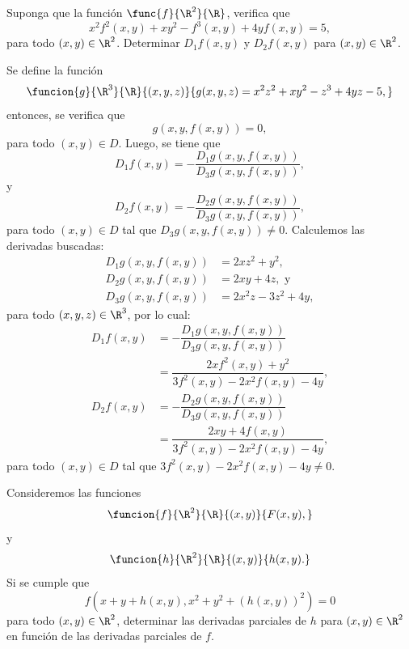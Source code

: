 \documentclass[a4,11pt]{aleph-examen}
\begin{document}
\begin{preguntas}
\begin{respuesta}
\begin{respuesta}
\item 
    Suponga que la función $\func{f}{\R^2}{\R}$, verifica que
    \[
        x^2 f^2(x, y) + x y^2 - f^3(x, y) + 4 y f(x, y) = 5,
    \]
    para todo $(x, y)\in \R^2$. Determinar $D_1 f(x, y)$ y $D_2 f(x, y)$ para $(x, y)\in \R^2$.

\begin{respuesta}
    Se define la función
    \[
    \funcion{g}{\R^3}{\R}
    {(x, y, z)}{g(x, y, z) = x^2 z^2 + x y^2 - z^3 + 4yz - 5,}
	\]
    entonces, se verifica que
    \[
    g(x, y, f(x, y)) = 0,
    \]
    para todo $(x, y)\in D$. Luego, se tiene que
    \[
    D_1 f(x, y) = -\dfrac{D_1 g(x, y, f(x, y))}{D_3 g(x, y, f(x, y))},
    \]
    y
    \[
    D_2 f(x, y) = -\dfrac{D_2 g(x, y, f(x, y))}{D_3 g(x, y, f(x, y))},
    \]
    para todo $(x, y) \in D$ tal que $D_3 g(x, y, f(x, y)) \neq 0$.
    Calculemos las derivadas buscadas:
    \begin{align*}
    D_1 g(x, y, f(x, y)) &= 2xz^2 + y^2,\\
    D_2 g(x, y, f(x, y)) &= 2xy + 4z, \mbox{ y}\\
    D_3 g(x, y, f(x, y)) &= 2x^2 z - 3z^2 + 4y,
    \end{align*}
    para todo $(x, y, z)\in\R^3$, por lo cual:
    \begin{align*}
        D_1 f(x, y) &= -\dfrac{D_1 g(x, y, f(x, y))}{D_3 g(x, y, f(x, y))}\\
        &= \dfrac{2xf^2(x, y) + y^2}{3f^2(x, y) - 2x^2 f(x, y) - 4y},
    \end{align*}
    \begin{align*}
        D_2 f(x, y) &= -\dfrac{D_2 g(x, y, f(x, y))}{D_3 g(x, y, f(x, y))}\\
        &= \dfrac{2xy + 4f(x, y)}{3f^2(x, y) - 2x^2 f(x, y) - 4y},
    \end{align*}
    para todo $(x, y)\in D$ tal que $3f^2(x, y) - 2x^2 f(x, y) - 4y \neq 0$.
\end{respuesta}

\item
    Consideremos las funciones
    \[
        \funcion{f}{\R^2}{\R}{(x,y)}{F(x,y),}
    \]
    y 
    \[
        \funcion{h}{\R^2}{\R}{(x,y)}{h(x,y).}
    \]
    Si se cumple que
    \[
        f(x+y+h(x,y),x^2+y^2+(h(x,y))^2)=0
    \]
    para todo $(x,y)\in\R^2$, determinar las derivadas parciales de $h$ para $(x,y) \in\R^2$ en función de las derivadas parciales de $f$. 


\end{respuesta}
\end{respuesta}
\end{preguntas}
\end{document}
